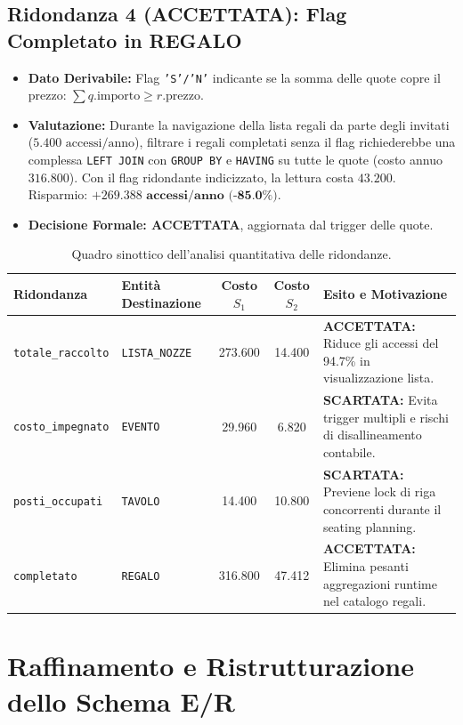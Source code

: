 \subsection{Ridondanza 4 (ACCETTATA): Flag Completato in REGALO}
\begin{itemize}[noitemsep]
    \item \textbf{Dato Derivabile:} Flag \texttt{'S'/'N'} indicante se la somma delle quote copre il prezzo: $\sum q.\text{importo} \ge r.\text{prezzo}$.
    \item \textbf{Valutazione:} Durante la navigazione della lista regali da parte degli invitati ($5.400 \text{ accessi/anno}$), filtrare i regali completati senza il flag richiederebbe una complessa \texttt{LEFT JOIN} con \texttt{GROUP BY} e \texttt{HAVING} su tutte le quote (costo annuo $316.800$). Con il flag ridondante indicizzato, la lettura costa $43.200$. Risparmio: $\mathbf{+269.388 \text{ accessi/anno (-85.0\%)}}$.
    \item \textbf{Decisione Formale: ACCETTATA}, aggiornata dal trigger delle quote.
\end{itemize}

\begin{table}[h!]
\centering
\small
\begin{tabularx}{\textwidth}{l p{3.8cm} c c X}
\toprule
\textbf{Ridondanza} & \textbf{Entità Destinazione} & \textbf{Costo $S_1$} & \textbf{Costo $S_2$} & \textbf{Esito e Motivazione} \\
\midrule
\texttt{totale\_raccolto} & \texttt{LISTA\_NOZZE} & 273.600 & 14.400 & \textbf{ACCETTATA:} Riduce gli accessi del 94.7\% in visualizzazione lista. \\
\addlinespace
\texttt{costo\_impegnato} & \texttt{EVENTO} & 29.960 & 6.820 & \textbf{SCARTATA:} Evita trigger multipli e rischi di disallineamento contabile. \\
\addlinespace
\texttt{posti\_occupati} & \texttt{TAVOLO} & 14.400 & 10.800 & \textbf{SCARTATA:} Previene lock di riga concorrenti durante il seating planning. \\
\addlinespace
\texttt{completato} & \texttt{REGALO} & 316.800 & 47.412 & \textbf{ACCETTATA:} Elimina pesanti aggregazioni runtime nel catalogo regali. \\
\bottomrule
\end{tabularx}
\caption{Quadro sinottico dell'analisi quantitativa delle ridondanze.}
\label{tab:quadro_ridondanze}
\end{table}

\section{Raffinamento e Ristrutturazione dello Schema E/R}

